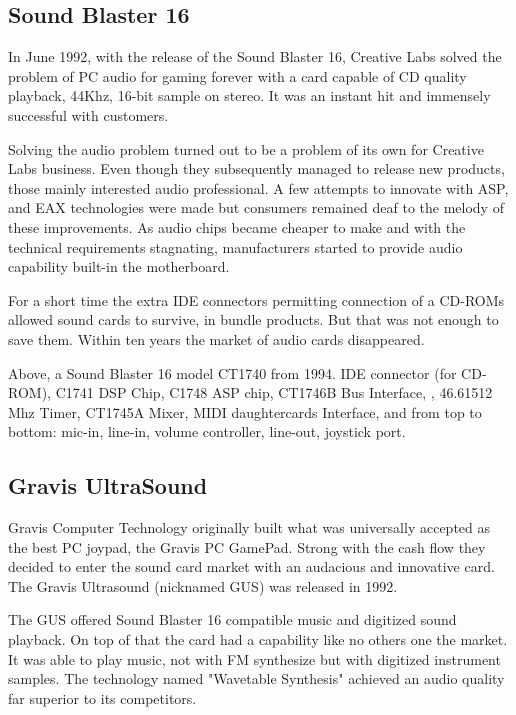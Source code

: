 \subsection{Sound Blaster 16}
 In June 1992, with the release of the Sound Blaster 16, Creative Labs solved the problem of PC audio for gaming forever with a card capable of CD quality playback, 44Khz, 16-bit sample on stereo. It was an instant hit and immensely successful with customers.\\
\par
{}
\par
Solving the audio problem turned out to be a problem of its own for Creative Labs business. Even though they subsequently managed to release new products, those mainly interested audio professional. A few attempts to innovate with ASP, and EAX technologies were made but consumers remained deaf to the melody of these improvements. As audio chips became cheaper to make and with the technical requirements stagnating, manufacturers started to provide audio capability built-in the motherboard.\\
\par
For a short time the extra IDE connectors permitting connection of a CD-ROMs allowed sound cards to survive, in bundle products. But that was not enough to save them. Within ten years the market of audio cards disappeared.\\
\par
{}
\par
Above, a Sound Blaster 16 model CT1740 from 1994.  IDE connector (for CD-ROM),  C1741 DSP Chip,  C1748 ASP chip,  CT1746B Bus Interface, , 46.61512 Mhz Timer,  CT1745A Mixer,  MIDI daughtercards Interface, and  from top to bottom: mic-in, line-in, volume controller, line-out, joystick port.







\subsection{Gravis UltraSound}
Gravis Computer Technology originally built what was universally accepted as the best PC joypad, the Gravis PC GamePad. Strong with the cash flow they decided to enter the sound card market with an audacious and innovative card. The Gravis Ultrasound (nicknamed GUS) was released in 1992.\\
\par
The GUS offered Sound Blaster 16 compatible music and digitized sound playback. On top of that the card had a capability like no others one the market. It was able to play music, not with FM synthesize but with digitized instrument samples. The technology named "Wavetable Synthesis" achieved an audio quality far superior to its competitors.


